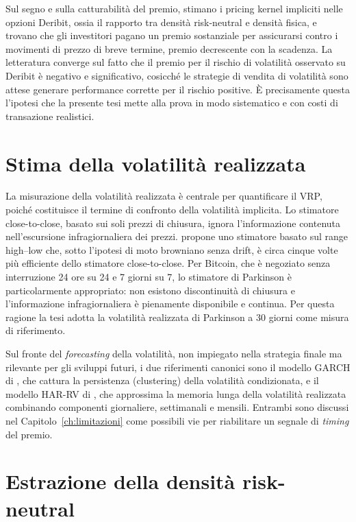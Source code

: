 Sul segno e sulla catturabilità del premio, \citet{winkel2023pricing}
stimano i pricing kernel impliciti nelle opzioni Deribit, ossia il rapporto
tra densità risk-neutral e densità fisica, e trovano che gli investitori
pagano un premio sostanziale per assicurarsi contro i movimenti di prezzo
di breve termine, premio decrescente con la scadenza. La letteratura
converge sul fatto che il premio per il rischio di volatilità osservato su
Deribit è negativo e significativo, cosicché le strategie di vendita di
volatilità sono attese generare performance corrette per il rischio
positive. È precisamente questa l'ipotesi che la presente tesi mette alla
prova in modo sistematico e con costi di transazione realistici.

\section{Stima della volatilità realizzata}
\label{sec:lit-realized-vol}

La misurazione della volatilità realizzata è centrale per quantificare il
VRP, poiché costituisce il termine di confronto della volatilità implicita.
Lo stimatore close-to-close, basato sui soli prezzi di chiusura, ignora
l'informazione contenuta nell'escursione infragiornaliera dei prezzi.
\citet{parkinson1980extreme} propone uno stimatore basato sul range
high--low che, sotto l'ipotesi di moto browniano senza drift, è circa
cinque volte più efficiente dello stimatore close-to-close. Per Bitcoin,
che è negoziato senza interruzione 24 ore su 24 e 7 giorni su 7, lo
stimatore di Parkinson è particolarmente appropriato: non esistono
discontinuità di chiusura e l'informazione infragiornaliera è pienamente
disponibile e continua. Per questa ragione la tesi adotta la volatilità
realizzata di Parkinson a 30 giorni come misura di riferimento.

Sul fronte del \emph{forecasting} della volatilità, non impiegato nella
strategia finale ma rilevante per gli sviluppi futuri, i due riferimenti
canonici sono il modello GARCH di \citet{bollerslev1986generalized}, che
cattura la persistenza (clustering) della volatilità condizionata, e il
modello HAR-RV di \citet{corsi2009simple}, che approssima la memoria lunga
della volatilità realizzata combinando componenti giornaliere, settimanali
e mensili. Entrambi sono discussi nel Capitolo~\ref{ch:limitazioni} come
possibili vie per riabilitare un segnale di \emph{timing} del premio.

\section{Estrazione della densità risk-neutral}
\label{sec:lit-rnd}

